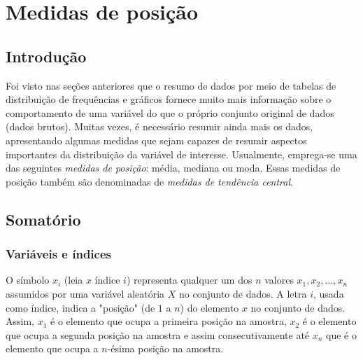 \documentclass[11pt,fleqn]{book} %
\begin{document}


\chapter{Medidas de posição}


\section{Introdução}
Foi visto nas seções anteriores que o resumo de dados por meio de tabelas de distribuição de frequências e gráficos
fornece muito mais informação sobre o comportamento de uma variável do que o próprio conjunto original de dados (dados brutos). Muitas vezes, é necessário resumir ainda mais os dados, apresentando algumas medidas que sejam capazes de resumir aspectos importantes da distribuição da variável de interesse. Usualmente, emprega-se uma das seguintes {\itshape medidas de posição}: média, mediana ou moda. Essas medidas de posição também são denominadas de {\itshape medidas de tendência central}.

\section{Somatório}
\vspace{0,3cm}
\subsection{Variáveis e índices}
\vspace{0,3cm}

O símbolo $x_i$ (leia $x$ índice $i$) representa qualquer um dos $n$ valores $x_1, x_2, ..., x_n$ assumidos por uma variável aleatória $X$ no conjunto de dados. A letra $i$, usada como índice, indica a "posição" (de $1$ a $n$) do elemento $x$ no conjunto de dados. Assim, $x_1$ é o elemento que ocupa a primeira posição na amostra, $x_2$ é o elemento que ocupa a segunda posição na amostra e assim consecutivamente até $x_n$ que é o elemento que ocupa a 
$n$-ésima posição na amostra.\\
\end{document}
